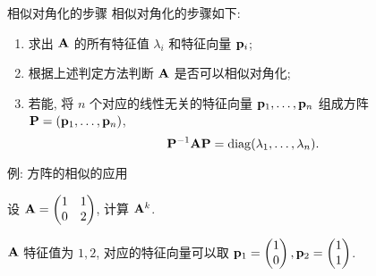 \begin{frame}{相似对角化的步骤}
	\onslide<+->
	相似对角化的步骤如下:
	\begin{enumerate}
		\item 求出 ${\mathbf{A}}$ 的所有特征值 $\lambda_i$ 和特征向量 ${\mathbf{p}}_i$;
		\item 根据上述判定方法判断 ${\mathbf{A}}$ 是否可以相似对角化;
		\item 若能, 将 $n$ 个对应的线性无关的特征向量 ${\mathbf{p}}_1,\dots,{\mathbf{p}}_n$ 组成方阵 ${\mathbf{P}}=({\mathbf{p}}_1,\dots,{\mathbf{p}}_n)$, 
		\[{\mathbf{P}}^{-1}{\mathbf{A}}{\mathbf{P}}={\mathrm{diag}}(\lambda_1,\dots,\lambda_n).\]
	\end{enumerate}
\end{frame}


\begin{frame}{例: 方阵的相似的应用}
	\onslide<+->
	\begin{example}
		设 ${\mathbf{A}}=\begin{pmatrix}
			1&1\\
			0&2
		\end{pmatrix}$, 计算 ${\mathbf{A}}^k$.
	\end{example}
	\onslide<+->
	\begin{solution}
		${\mathbf{A}}$ 特征值为 $1,2$, 对应的特征向量可以取 ${\mathbf{p}}_1=\begin{pmatrix}
			1\\0
		\end{pmatrix},{\mathbf{p}}_2=\begin{pmatrix}
			1\\1
		\end{pmatrix}$.
		\onslide<+->{%
			因此
			\[\bfA^k=\bfP\begin{pmatrix}
				1&\\&2
			\end{pmatrix}^k\bfP^{-1}=\begin{pmatrix}
				1&1\\0&1
			\end{pmatrix}\begin{pmatrix}
				1&\\&2^k
			\end{pmatrix}\begin{pmatrix}
				1&-1\\0&1
			\end{pmatrix}=\begin{pmatrix}
				1&2^k-1\\
				0&2^k
			\end{pmatrix}.\]
		}
	\end{solution}
\end{frame}


